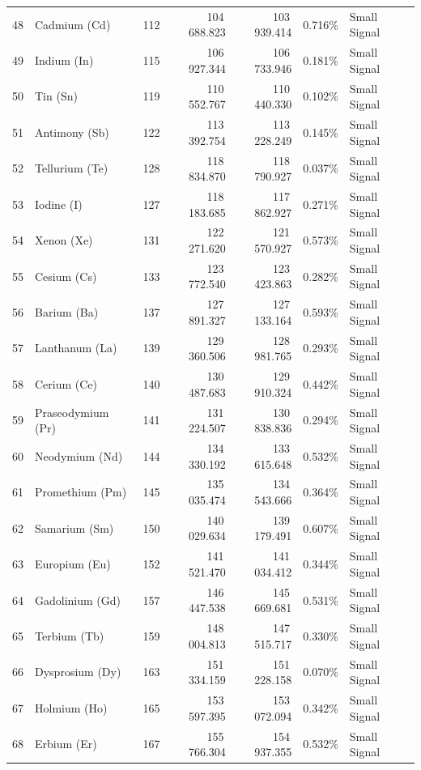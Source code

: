 \begin{small}
\begin{longtable}{r l r r r r l}
48 & Cadmium (Cd)    & 112 & 104\,688.823 & 103\,939.414 & 0.716\% & Small Signal \\
49 & Indium (In)     & 115 & 106\,927.344 & 106\,733.946 & 0.181\% & Small Signal \\
50 & Tin (Sn)        & 119 & 110\,552.767 & 110\,440.330 & 0.102\% & Small Signal \\
51 & Antimony (Sb)   & 122 & 113\,392.754 & 113\,228.249 & 0.145\% & Small Signal \\
52 & Tellurium (Te)  & 128 & 118\,834.870 & 118\,790.927 & 0.037\% & Small Signal \\
53 & Iodine (I)      & 127 & 118\,183.685 & 117\,862.927 & 0.271\% & Small Signal \\
54 & Xenon (Xe)      & 131 & 122\,271.620 & 121\,570.927 & 0.573\% & Small Signal \\
\midrule
55 & Cesium (Cs)       & 133 & 123\,772.540 & 123\,423.863 & 0.282\% & Small Signal \\
56 & Barium (Ba)       & 137 & 127\,891.327 & 127\,133.164 & 0.593\% & Small Signal \\
57 & Lanthanum (La)    & 139 & 129\,360.506 & 128\,981.765 & 0.293\% & Small Signal \\
58 & Cerium (Ce)       & 140 & 130\,487.683 & 129\,910.324 & 0.442\% & Small Signal \\
59 & Praseodymium (Pr) & 141 & 131\,224.507 & 130\,838.836 & 0.294\% & Small Signal \\
60 & Neodymium (Nd)    & 144 & 134\,330.192 & 133\,615.648 & 0.532\% & Small Signal \\
61 & Promethium (Pm)   & 145 & 135\,035.474 & 134\,543.666 & 0.364\% & Small Signal \\
62 & Samarium (Sm)     & 150 & 140\,029.634 & 139\,179.491 & 0.607\% & Small Signal \\
63 & Europium (Eu)     & 152 & 141\,521.470 & 141\,034.412 & 0.344\% & Small Signal \\
64 & Gadolinium (Gd)   & 157 & 146\,447.538 & 145\,669.681 & 0.531\% & Small Signal \\
65 & Terbium (Tb)      & 159 & 148\,004.813 & 147\,515.717 & 0.330\% & Small Signal \\
66 & Dysprosium (Dy)   & 163 & 151\,334.159 & 151\,228.158 & 0.070\% & Small Signal \\
67 & Holmium (Ho)      & 165 & 153\,597.395 & 153\,072.094 & 0.342\% & Small Signal \\
68 & Erbium (Er)       & 167 & 155\,766.304 & 154\,937.355 & 0.532\% & Small Signal \\

\end{longtable}
\end{small}
